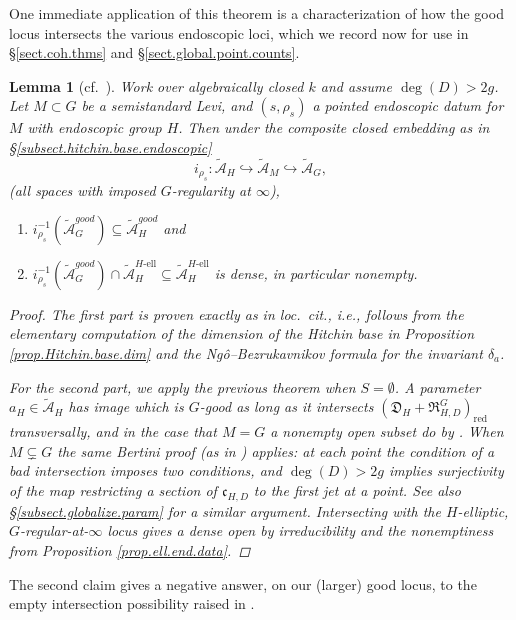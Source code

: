 \documentclass[openany]{amsbook}
\newtheorem{lemma}[theorem]{Lemma}
\theoremstyle{definition}
\theoremstyle{remark}
\numberwithin{equation}{section}
\newcommand{\cA}{\mathcal{A}}
\newcommand{\red}{\mathrm{red}}
\renewcommand{\-}{\operatorname{-}}
\newcommand{\good}{\mathit{good}}
\newcommand{\el}{\text{-ell}}
\newcommand{\ctA}{\widetilde{\cA}}
\newcommand{\fc}{\mathfrak{c}}
\newcommand{\fD}{\mathfrak{D}}
\newcommand{\fR}{\mathfrak{R}}
\begin{document}
One immediate application of this theorem is a characterization of how the good locus intersects the various endoscopic loci, which we record now for use in \S \ref{sect.coh.thms} and \S \ref{sect.global.point.counts}.

\begin{lemma}[{cf.\ \cite[Lemme 14.3.1]{CLII}}]\label{lem.good.locus.compat.end}
    Work over algebraically closed $k$ and assume $\deg(D) > 2g$. Let $M \subset G$ be a semistandard Levi, and $(s, \rho_s)$ a pointed endoscopic datum for $M$ with endoscopic group $H$. Then under the composite closed embedding as in \S \ref{subsect.hitchin.base.endoscopic}
    $$
        i_{\rho_s} : \ctA_{H} \hookrightarrow \ctA_M \hookrightarrow \ctA_G,
    $$
    (all spaces with imposed $G$-regularity at $\infty$),
    \begin{enumerate}
        \item $i_{\rho_s}^{-1}(\ctA_G^{\good}) \subseteq \ctA_{H}^{\good}$ and
        \item $i_{\rho_s}^{-1}(\ctA_G^{\good}) \cap \ctA_{H}^{H\el} \subseteq \ctA_{H}^{H\el}$ is dense, in particular nonempty. 
    \end{enumerate}
    \begin{proof}
        The first part is proven exactly as in \textit{loc.\ cit.}, i.e., follows from the elementary computation of the dimension of the Hitchin base in Proposition \ref{prop.Hitchin.base.dim} and the Ng\^{o}--Bezrukavnikov formula for the invariant $\delta_a$.

        For the second part, we apply the previous theorem when $S = \emptyset$. A parameter $a_H \in \ctA_H$ has image which is $G$-good as long as it intersects $(\fD_H + \fR_{H,D}^G)_{\red}$ transversally, and in the case that $M = G$ a nonempty open subset do by \cite[Lemme 8.5.1]{ngofl}. When $M \subsetneq G$ the same Bertini proof (as in \cite[Proposition 4.7.1]{ngofl}) applies: at each point the condition of a bad intersection imposes two conditions, and $\deg(D) > 2g$ implies surjectivity of the map restricting a section of $\fc_{H,D}$ to the first jet at a point. See also \S \ref{subsect.globalize.param} for a similar argument. Intersecting with the $H$-elliptic, $G$-regular-at-$\infty$ locus gives a dense open by irreducibility and the nonemptiness from Proposition \ref{prop.ell.end.data}.
    \end{proof}
\end{lemma}

The second claim gives a negative answer, on our (larger) good locus, to the empty intersection possibility raised in \cite[\S 7.8.4]{ngofl}.
\end{document}

